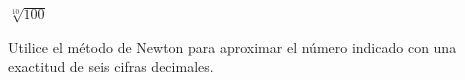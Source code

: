 \item $\sqrt[10]{100}$
\par
Utilice el método de Newton para aproximar el número indicado con una exactitud de seis cifras decimales.
